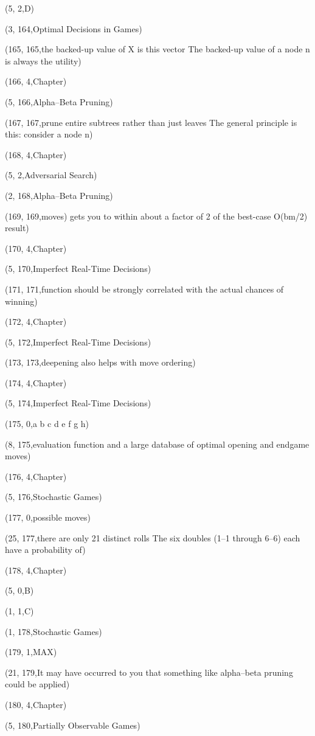 (5, 2,D)

(3, 164,Optimal Decisions in Games)

(165, 165,the backed-up value of X is this vector The backed-up value of a node n is always the utility)

(166, 4,Chapter)

(5, 166,Alpha–Beta Pruning)

(167, 167,prune entire subtrees rather than just leaves The general principle is this: consider a node n)

(168, 4,Chapter)

(5, 2,Adversarial Search)

(2, 168,Alpha–Beta Pruning)

(169, 169,moves) gets you to within about a factor of 2 of the best-case O(bm/2) result)

(170, 4,Chapter)

(5, 170,Imperfect Real-Time Decisions)

(171, 171,function should be strongly correlated with the actual chances of winning)

(172, 4,Chapter)

(5, 172,Imperfect Real-Time Decisions)

(173, 173,deepening also helps with move ordering)

(174, 4,Chapter)

(5, 174,Imperfect Real-Time Decisions)

(175, 0,a     b    c    d    e     f     g    h)

(8, 175,evaluation function and a large database of optimal opening and endgame moves)

(176, 4,Chapter)

(5, 176,Stochastic Games)

(177, 0,possible moves)

(25, 177,there are only 21 distinct rolls The six doubles (1–1 through 6–6) each have a probability of)

(178, 4,Chapter)

(5, 0,B)

(1, 1,C)

(1, 178,Stochastic Games)

(179, 1,MAX)

(21, 179,It may have occurred to you that something like alpha–beta pruning could be applied)

(180, 4,Chapter)

(5, 180,Partially Observable Games)

